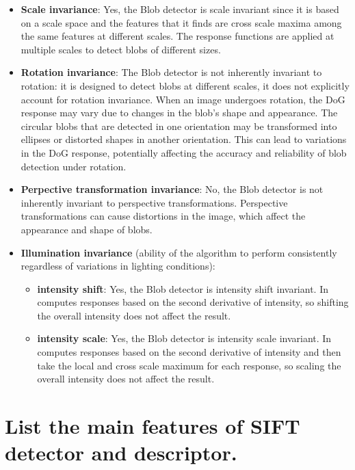 \documentclass{article}
\begin{document}
\begin{itemize}
    \item \textbf{Scale invariance}: Yes, the Blob detector is scale invariant since it is based on a scale space and the features that it finds are cross scale maxima among the same features at different scales. The response functions are applied at multiple scales to detect blobs of different sizes.
    \item \textbf{Rotation invariance}: The Blob detector is not inherently invariant to rotation: it is designed to detect blobs at different scales, it does not explicitly account for rotation invariance. When an image undergoes rotation, the DoG response may vary due to changes in the blob's shape and appearance. The circular blobs that are detected in one orientation may be transformed into ellipses or distorted shapes in another orientation. This can lead to variations in the DoG response, potentially affecting the accuracy and reliability of blob detection under rotation.
    \item \textbf{Perpective transformation invariance}: No, the Blob detector is not inherently invariant to perspective transformations. Perspective transformations can cause distortions in the image, which affect the appearance and shape of blobs.
    \item \textbf{Illumination invariance} (ability of the algorithm to perform consistently regardless of variations in lighting conditions):
    \begin{itemize}
        \item \textbf{intensity shift}: Yes, the Blob detector is intensity shift invariant. In computes responses based on the second derivative of intensity, so shifting the overall intensity does not affect the result.
        \item \textbf{intensity scale}: Yes, the Blob detector is intensity scale invariant. In computes responses based on the second derivative of intensity and then take the local and cross scale maximum for each response, so scaling the overall intensity does not affect the result.
    \end{itemize}
\end{itemize}

\newpage

\section{List the main features of SIFT detector and descriptor.}
\end{document}
